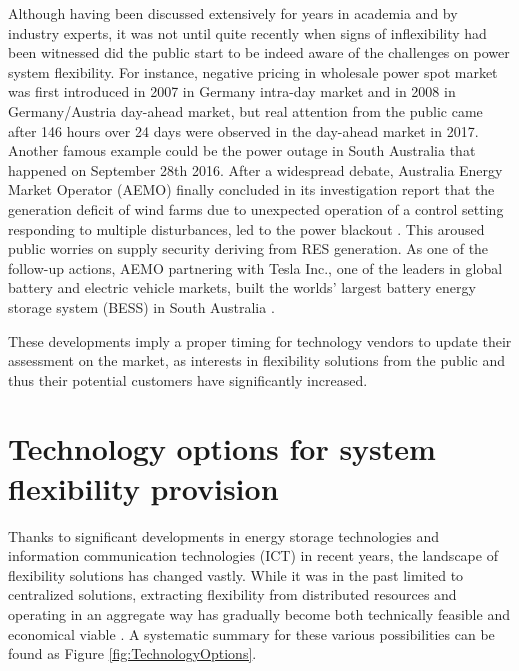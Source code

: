 Although having been discussed extensively for years in academia and by industry experts, it was not until quite recently when signs of inflexibility had been witnessed did the public start to be indeed aware of the challenges on power system flexibility. For instance, negative pricing in wholesale power spot market was first introduced in 2007 in Germany intra-day market and in 2008 in Germany/Austria day-ahead market\cite{EPEX_negative_price}, but real attention from the public came after 146 hours over 24 days were observed in the day-ahead market in 2017. Another famous example could be the power outage in South Australia that happened on September 28th 2016. After a widespread debate, Australia Energy Market Operator (AEMO) finally concluded in its investigation report that the generation deficit of wind farms due to unexpected operation of a control setting responding to multiple disturbances, led to the power blackout \cite{AEMO2016SA}.  This aroused public worries on supply security deriving from RES generation. As one of the follow-up actions, AEMO partnering with Tesla Inc., one of the leaders in global battery and electric vehicle markets,  built the worlds' largest battery energy storage system (BESS) in South Australia \cite{AEMO_tesla}.

These developments imply a proper timing for technology vendors to update their assessment on the market, as interests in flexibility solutions from the public and thus their potential customers have significantly increased.

\section[Technology options for system flexibility provision]{Technology options for system flexibility provision%
	}

Thanks to significant developments in energy storage technologies and information communication technologies (ICT) in recent years, the landscape of flexibility solutions has changed vastly. While it was in the past limited to centralized solutions, extracting flexibility from distributed resources and operating in an aggregate way has gradually become both technically feasible and economical viable \cite{Cochran2014,Wang2017,Lund2015,Muller2016}. A systematic summary for these various possibilities can be found as Figure \ref{fig:TechnologyOptions}.

